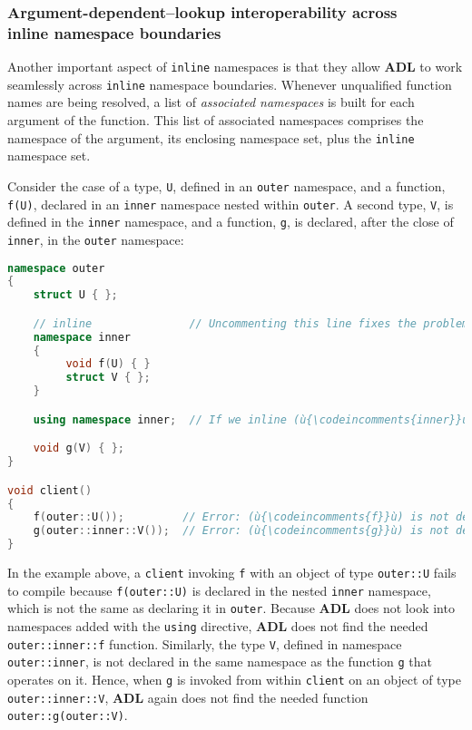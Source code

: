 \subsubsection[Argument-dependent–lookup interoperability across {\tt inline} {\tt namespace} boundaries]{Argument-dependent–lookup interoperability across\\[0.5ex] {\SubsubsecCode inline} {\SubsubsecCode namespace} boundaries}\label{argument-dependent–lookup-interoperability-across-inline-namespace-boundaries}

Another important aspect of \texttt{inline} namespaces is that they
allow \textbf{ADL} to work seamlessly across \texttt{inline} namespace
boundaries. Whenever unqualified function names are being resolved, a
list of \emph{associated namespaces} is built for each argument of the
function. This list of associated namespaces comprises the namespace of the
argument, its enclosing namespace set, plus the \texttt{inline}
namespace set.

Consider the case of a type, \texttt{U}, defined in an \texttt{outer}
namespace, and a function, \texttt{f(U)}, declared in an \texttt{inner}
namespace nested within \texttt{outer}. A second type, \texttt{V}, is
defined in the \texttt{inner} namespace, and a function, \texttt{g}, is
declared, after the close of \texttt{inner}, in the \texttt{outer}
namespace:

\begin{lstlisting}[language=C++]
namespace outer
{
    struct U { };

    // inline               // Uncommenting this line fixes the problem.
    namespace inner
    {
         void f(U) { }
         struct V { };
    }

    using namespace inner;  // If we inline (ù{\codeincomments{inner}}ù), we don't need this line.

    void g(V) { };
}

void client()
{
    f(outer::U());         // Error: (ù{\codeincomments{f}}ù) is not declared in this scope.
    g(outer::inner::V());  // Error: (ù{\codeincomments{g}}ù) is not declared in this scope.
}
\end{lstlisting}
    
\noindent In the example above, a \texttt{client} invoking \texttt{f} with an
object of type \texttt{outer::U} fails to compile because
\texttt{f(outer::U)} is declared in the nested \texttt{inner} namespace,
which is not the same as declaring it in \texttt{outer}. Because
\textbf{ADL} does not look into namespaces added with the \texttt{using}
directive, \textbf{ADL} does not find the needed
\texttt{outer::inner::f} function. Similarly, the type \texttt{V},
defined in namespace \texttt{outer::inner}, is not declared in the same
namespace as the function \texttt{g} that operates on it. Hence, when
\texttt{g} is invoked from within \texttt{client} on an object of type
\texttt{outer::inner::V}, \textbf{ADL} again does not find the needed
function \texttt{outer::g(outer::V)}.

